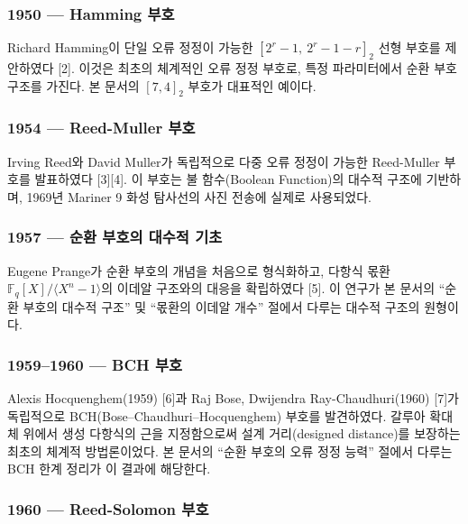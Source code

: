 \documentclass[
  oneside]{article}
\begin{document}
\subsubsection{1950 --- Hamming 부호}\label{hamming-uxbd80uxd638}

Richard Hamming이 단일 오류 정정이 가능한 \([2^r - 1,\ 2^r - 1 - r]_2\)
선형 부호를 제안하였다 {[}2{]}. 이것은 최초의 체계적인 오류 정정 부호로,
특정 파라미터에서 순환 부호 구조를 가진다. 본 문서의 \([7, 4]_2\) 부호가
대표적인 예이다.

\subsubsection{1954 --- Reed-Muller
부호}\label{reed-muller-uxbd80uxd638}

Irving Reed와 David Muller가 독립적으로 다중 오류 정정이 가능한
Reed-Muller 부호를 발표하였다 {[}3{]}{[}4{]}. 이 부호는 불 함수(Boolean
Function)의 대수적 구조에 기반하며, 1969년 Mariner 9 화성 탐사선의 사진
전송에 실제로 사용되었다.

\subsubsection{1957 --- 순환 부호의 대수적
기초}\label{uxc21cuxd658-uxbd80uxd638uxc758-uxb300uxc218uxc801-uxae30uxcd08}

Eugene Prange가 순환 부호의 개념을 처음으로 형식화하고, 다항식 몫환
\(\mathbb{F}_q[X]/ \langle X^n - 1 \rangle\)의 이데알 구조와의 대응을
확립하였다 {[}5{]}. 이 연구가 본 문서의 ``순환 부호의 대수적 구조'' 및
``몫환의 이데알 개수'' 절에서 다루는 대수적 구조의 원형이다.

\subsubsection{1959--1960 --- BCH 부호}\label{bch-uxbd80uxd638}

Alexis Hocquenghem(1959) {[}6{]}과 Raj Bose, Dwijendra
Ray-Chaudhuri(1960) {[}7{]}가 독립적으로
BCH(Bose--Chaudhuri--Hocquenghem) 부호를 발견하였다. 갈루아 확대체
위에서 생성 다항식의 근을 지정함으로써 설계 거리(designed distance)를
보장하는 최초의 체계적 방법론이었다. 본 문서의 ``순환 부호의 오류 정정
능력'' 절에서 다루는 BCH 한계 정리가 이 결과에 해당한다.

\subsubsection{1960 --- Reed-Solomon
부호}\label{reed-solomon-uxbd80uxd638}
\end{document}
